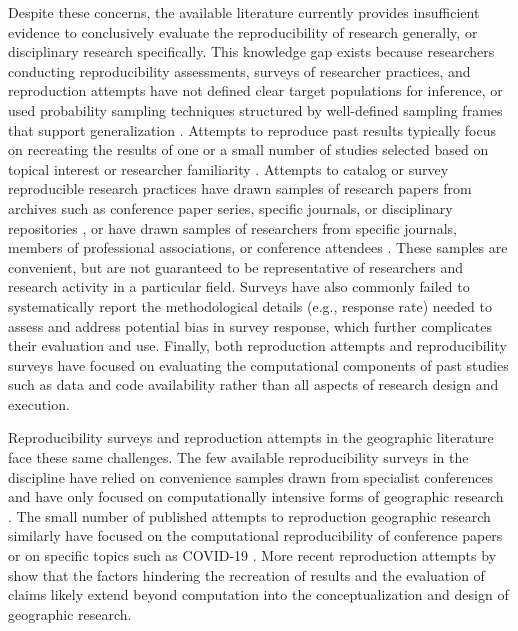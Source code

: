 \documentclass[]{interact}
\theoremstyle{plain}%
\theoremstyle{definition}
\theoremstyle{remark}
\begin{document}
Despite these concerns, the available literature currently provides insufficient evidence to conclusively evaluate the reproducibility of research generally, or disciplinary research specifically.
This knowledge gap exists because researchers conducting reproducibility assessments, surveys of researcher practices, and reproduction attempts have not defined clear target populations for inference, or used probability sampling techniques structured by well-defined sampling frames that support generalization \citep{NASEM2019}.
Attempts to reproduce past results typically focus on recreating the results of one or a small number of studies selected based on topical interest or researcher familiarity \citep{camerer2016evaluating, camerer2018evaluating, open2015estimating}. 
Attempts to catalog or survey reproducible research practices have drawn samples of research papers from archives such as conference paper series, specific journals, or disciplinary repositories \citep{byrne_2017, gundersen2018state, stodden2016enhancing, stodden2018enabling}, or have drawn samples of researchers from specific journals, members of professional associations, or conference attendees \citep{baker20161}.
These samples are convenient, but are not guaranteed to be representative of researchers and research activity in a particular field. 
Surveys have also commonly failed to systematically report the methodological details (e.g., response rate) needed to assess and address potential bias in survey response, which further complicates their evaluation and use. 
Finally, both reproduction attempts and reproducibility surveys have focused on evaluating the computational components of past studies such as data and code availability rather than all aspects of research design and execution.

Reproducibility surveys and reproduction attempts in the geographic literature face these same challenges. 
The few available reproducibility surveys in the discipline have relied on convenience samples drawn from specialist conferences and have only focused on computationally intensive forms of geographic research \citep{balz2020reproducibility, konkol2019, ostermann2017}. 
The small number of published attempts to reproduction geographic research similarly have focused on the computational reproducibility of conference papers \citep{Nust-AGILE_2018, Nust_AGILE_2020, Nust_AGILE_2021, Nust_AGILE_2022, ostermann2021,} or on specific topics such as COVID-19 \citep{Holler2023disability, Kedron2022dimaggio, Kedron2023Beyond, paez2022reproducibility}. 
More recent reproduction attempts by \citet{Kedron2023Beyond} show that the factors hindering the recreation of results and the evaluation of claims likely extend beyond computation into the conceptualization and design of geographic research.
\end{document}
